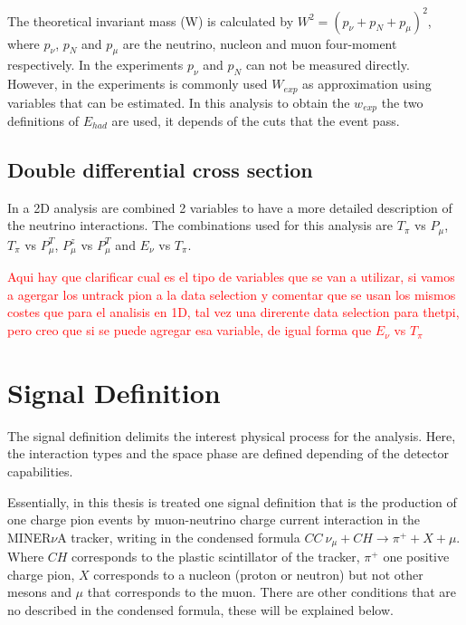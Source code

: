 The theoretical invariant mass (W) is calculated by $W^2=(p_\nu+p_N+p_\mu)^2$, where $p_\nu$, $p_N$ and $p_\mu$ are the neutrino, nucleon and muon four-moment respectively. In the experiments $p_\nu$ and $p_N$ can not be measured directly. However, in the experiments is commonly used $W_{exp}$ as approximation using variables that can be estimated. In this analysis to obtain the $w_{exp}$ the two definitions of $E_{had}$ are used, it depends of the cuts that the event pass.  

\subsection{Double differential cross section}
\label{Cap:Analysis:Variables:2DAnalysis}

In a 2D analysis are combined 2 variables to have a more detailed description of the neutrino interactions. The combinations used for this analysis are $T_\pi$ vs $P_\mu$, $T_\pi$ vs $P^T_\mu$, $P^z_\mu$ vs $P^T_\mu$ and $E_\nu$ vs $T_\pi$.

\textcolor{red}{Aqui hay que clarificar cual es el tipo de variables que se van a utilizar, si vamos a agergar los untrack pion a la data selection y comentar que se usan los mismos costes que para el analisis en 1D, tal vez una direrente data selection para thetpi, pero creo que si se puede agregar esa variable, de igual forma que $E_\nu$ vs $T_\pi$}


\section{Signal Definition}
\label{Cap:Analysis:SignalDefinition}

The signal definition delimits the interest physical process for the analysis. Here, the interaction types and the space phase are defined depending of the detector capabilities.

Essentially, in this thesis is treated one signal definition that is the production of one charge pion events by muon-neutrino charge current interaction in the MINER$\nu$A tracker, writing in the condensed formula $CC\ \nu_\mu+CH\xrightarrow{}\pi^+ + X + \mu$. Where $CH$ corresponds to the plastic scintillator of the tracker, $\pi^+$ one positive charge pion, $X$ corresponds to a nucleon (proton or neutron) but not other mesons and $\mu$ that corresponds to the muon. There are other conditions that are no described in the condensed formula, these will be explained below. 

